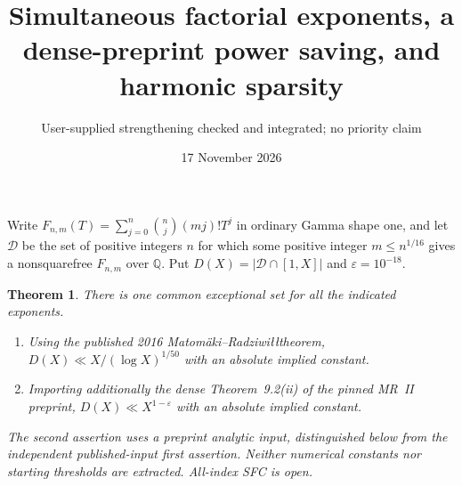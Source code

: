 \documentclass[11pt]{article}
\title{Simultaneous factorial exponents, a dense-preprint power saving, and harmonic sparsity}
\author{User-supplied strengthening checked and integrated; no priority claim}
\date{17 November 2026}
\newtheorem{theorem}{Theorem}
\newcommand{\Q}{\mathbb Q}
\begin{document}
\maketitle
Write $F_{n,m}(T)=\sum_{j=0}^n\binom nj(mj)!T^j$ in ordinary Gamma shape one,
and let $\mathcal D$ be the set of positive integers $n$ for which some
positive integer $m\le n^{1/16}$ gives a nonsquarefree $F_{n,m}$ over $\Q$.
Put $D(X)=|\mathcal D\cap[1,X]|$ and $\varepsilon=10^{-18}$.

\begin{theorem}\label{thm:simultaneous}
There is one common exceptional set for all the indicated exponents.
\begin{enumerate}
\item Using the published 2016 Matom\"aki--Radziwi\l\l theorem,
$D(X)\ll X/(\log X)^{1/50}$ with an absolute implied constant.
\item Importing additionally the dense Theorem~9.2(ii) of the pinned
MR~II preprint, $D(X)\ll X^{1-\varepsilon}$ with an absolute implied constant.
\end{enumerate}
The second assertion uses a preprint analytic input, distinguished below
from the independent published-input first assertion. Neither numerical
constants nor starting thresholds are extracted. All-index SFC is open.
\end{theorem}
\end{document}
